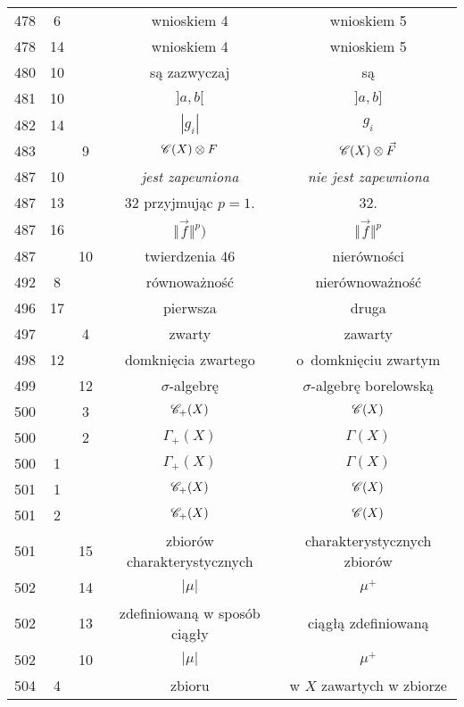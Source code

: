 \documentclass[a4paper,11pt]{article}
\begin{document}
\begin{center}
\begin{tabular}{|c|c|c|c|c|}
    478 &  6 & & wnioskiem 4 & wnioskiem 5 \\
    478 & 14 & & wnioskiem 4 & wnioskiem 5 \\
    480 & 10 & & są zazwyczaj & są \\
    481 & 10 & & $] a, b [$ & $] a, b]$ \\
    482 & 14 & & $| g_{ i } |$ & $g_{ i }$ \\
    483 & &  9 & $\mathcal{C}( X ) \otimes F$ & $\mathcal{C}( X ) \otimes \vec{ F }$ \\
    487 & 10 & & \textit{jest zapewniona} & \textit{nie jest zapewniona} \\
    487 & 13 & & 32 przyjmując $p = 1$. & 32. \\
    487 & 16 & & $\Vert \vec{ f } \Vert^{ p } )$
           & $\Vert \vec{ f } \Vert^{ p }$ \\
    487 & & 10 & twierdzenia 46 & nierówności \\
    492 &  8 & & równoważność & nierównoważność \\
    496 & 17 & & pierwsza & druga \\
    497 & &  4 & zwarty & zawarty \\
    498 & 12 & & domknięcia zwartego & o~domknięciu zwartym \\
    499 & & 12 & $\sigma$-algebrę & $\sigma$-algebrę borelowską \\
    500 & &  3 & $\mathcal{C}_{ + }( X )$ & $\mathcal{C}( X )$ \\
    500 & &  2 & $\Gamma_{ + }( X )$ & $\Gamma( X )$ \\
    500 &  1 & & $\Gamma_{ + }( X )$ & $\Gamma( X )$ \\
    501 &  1 & & $\mathcal{C}_{ + }( X )$ & $\mathcal{C}( X )$ \\
    501 &  2 & & $\mathcal{C}_{ + }( X )$ & $\mathcal{C}( X )$ \\
    501 & & 15 & zbiorów charakterystycznych & charakterystycznych
                                               zbiorów \\
    502 & & 14 & $| \mu |$ & $\mu^{ + }$ \\
    502 & & 13 & zdefiniowaną w sposób ciągły & ciągłą zdefiniowaną \\
    502 & & 10 & $| \mu |$ & $\mu^{ + }$ \\
    504 &  4 & & zbioru & w $X$ zawartych w zbiorze \\ \hline
  \end{tabular}

\end{center}
\end{document}
